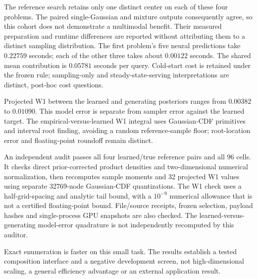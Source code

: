 The reference search retains only one distinct center on each of these four problems. The paired single-Gaussian and mixture outputs consequently agree, so this cohort does not demonstrate a multimodal benefit. Their measured preparation and runtime differences are reported without attributing them to a distinct sampling distribution. The first problem's five neural predictions take $0.22759$ seconds; each of the other three takes about $0.00122$ seconds. The shared mean contribution is $0.05781$ seconds per query. Cold-start cost is retained under the frozen rule; sampling-only and steady-state-serving interpretations are distinct, post-hoc cost questions.

Projected W1 between the learned and generating posteriors ranges from $0.00382$ to $0.01090$. This model error is separate from sampler error against the learned target. The empirical-versus-learned W1 integral uses Gaussian-CDF primitives and interval root finding, avoiding a random reference-sample floor; root-location error and floating-point roundoff remain distinct.

An independent audit passes all four learned/true reference pairs and all 96 cells. It checks direct prior-corrected product densities and two-dimensional numerical normalization, then recomputes sample moments and 32 projected W1 values using separate 32769-node Gaussian-CDF quantizations. The W1 check uses a half-grid-spacing and analytic tail bound, with a $10^{-9}$ numerical allowance that is not a certified floating-point bound. File/source receipts, frozen selection, payload hashes and single-process GPU snapshots are also checked. The learned-versus-generating model-error quadrature is not independently recomputed by this auditor.

Exact enumeration is faster on this small task. The results establish a tested composition interface and a negative development screen, not high-dimensional scaling, a general efficiency advantage or an external application result.
